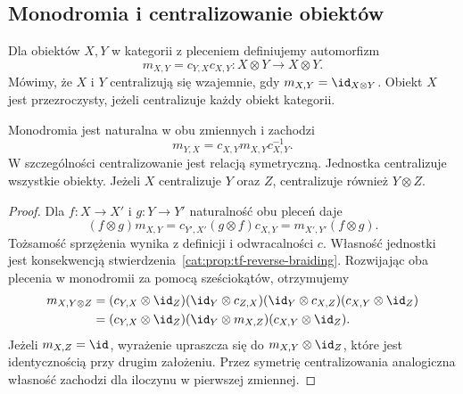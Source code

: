 \subsection{Monodromia i centralizowanie obiektów}

\begin{definicja}[Monodromia]\label{cat:def:tf-monodromy}
Dla obiektów $X,Y$ w kategorii z pleceniem definiujemy automorfizm
\[
 m_{X,Y}=c_{Y,X}c_{X,Y}:X\otimes Y\longrightarrow X\otimes Y.
\]
Mówimy, że $X$ i $Y$ centralizują się wzajemnie, gdy $m_{X,Y}=\id_{X\otimes Y}$. Obiekt $X$ jest przezroczysty, jeżeli centralizuje każdy obiekt kategorii.
\end{definicja}

\begin{stwierdzenie}\label{cat:prop:tf-monodromy}
Monodromia jest naturalna w obu zmiennych i zachodzi
\[
 m_{Y,X}=c_{X,Y}m_{X,Y}c_{X,Y}^{-1}.
\]
W szczególności centralizowanie jest relacją symetryczną. Jednostka centralizuje wszystkie obiekty. Jeżeli $X$ centralizuje $Y$ oraz $Z$, centralizuje również $Y\otimes Z$.
\end{stwierdzenie}
\begin{proof}
Dla $f:X\to X'$ i $g:Y\to Y'$ naturalność obu pleceń daje
\[
 (f\otimes g)m_{X,Y}
 =c_{Y',X'}(g\otimes f)c_{X,Y}
 =m_{X',Y'}(f\otimes g).
\]
Tożsamość sprzężenia wynika z definicji i odwracalności $c$. Własność jednostki jest konsekwencją stwierdzenia~\ref{cat:prop:tf-reverse-braiding}. Rozwijając oba plecenia w monodromii za pomocą sześciokątów, otrzymujemy
\[
\begin{aligned}
 m_{X,Y\otimes Z}
 &=(c_{Y,X}\otimes\id_Z)(\id_Y\otimes c_{Z,X})
   (\id_Y\otimes c_{X,Z})(c_{X,Y}\otimes\id_Z)\\
 &=(c_{Y,X}\otimes\id_Z)(\id_Y\otimes m_{X,Z})
   (c_{X,Y}\otimes\id_Z).
\end{aligned}
\]
Jeżeli $m_{X,Z}=\id$, wyrażenie upraszcza się do $m_{X,Y}\otimes\id_Z$, które jest identycznością przy drugim założeniu. Przez symetrię centralizowania analogiczna własność zachodzi dla iloczynu w pierwszej zmiennej.
\end{proof}


